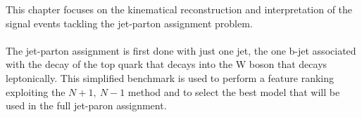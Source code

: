 \label{sec:kin}
\vspace{-1cm}
\minitoc
\vspace{0.5cm}
This chapter focuses on the kinematical reconstruction and interpretation of the signal events tackling the jet-parton assignment problem.
\\
\\
The jet-parton assignment is first done with just one jet, the one b-jet associated with the decay of the top quark that decays into the W boson that decays leptonically. This simplified benchmark is used to perform a feature ranking exploiting the $N+1,\: N-1$ method and to select the best model that will be used in the full jet-paron assignment.

